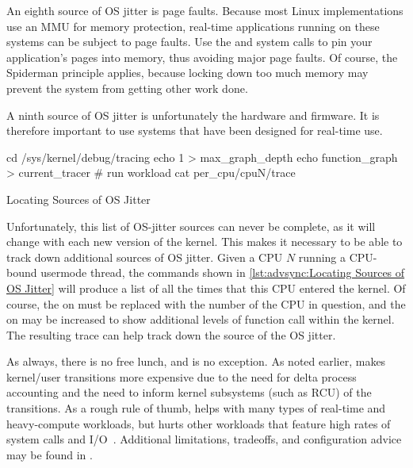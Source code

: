 An eighth source of OS jitter is page faults.
Because most Linux implementations use an MMU for memory protection,
real-time applications running on these systems can be subject
to page faults.
Use the  and  system calls to pin your
application's pages into memory, thus avoiding major page faults.
Of course, the Spiderman principle applies, because locking down
too much memory may prevent the system from getting other work done.

A ninth source of OS jitter is unfortunately the hardware and firmware.
It is therefore important to use systems that have been designed for
real-time use.

\begin{listing}[tb]
\begin{fcvlabel}
\begin{VerbatimL}[commandchars=\\\[\]]
cd /sys/kernel/debug/tracing
echo 1 > max_graph_depth		\lnlbl[echo1]
echo function_graph > current_tracer
# run workload
cat per_cpu/cpuN/trace			\lnlbl[cat]
\end{VerbatimL}
\end{fcvlabel}
\caption{Locating Sources of OS Jitter}
\label{lst:advsync:Locating Sources of OS Jitter}
\end{listing}

\begin{fcvref}
Unfortunately, this list of OS-jitter sources can never be complete,
as it will change with each new version of the kernel.
This makes it necessary to be able to track down additional sources
of OS jitter.
Given a CPU $N$ running a CPU-bound usermode thread, the
commands shown in
\cref{lst:advsync:Locating Sources of OS Jitter}
will produce a list of all the times that this CPU entered the kernel.
Of course, the  on  must be replaced with the
number of the CPU in question, and the  on  may be
increased
to show additional levels of function call within the kernel.
The resulting trace can help track down the source of the OS jitter.
\end{fcvref}

As always, there is no free lunch, and  is no exception.
As noted earlier,
 makes kernel/user transitions more expensive due to the
need for delta process accounting and the need to inform kernel subsystems
(such as RCU) of the transitions.
As a rough rule of thumb,  helps with many types of
real-time and heavy-compute workloads, but hurts other workloads
that feature high rates of system calls and
I/O~\cite{AbdullahAljuhni2018nohzfull}.
Additional limitations, tradeoffs, and configuration advice may be
found in .

